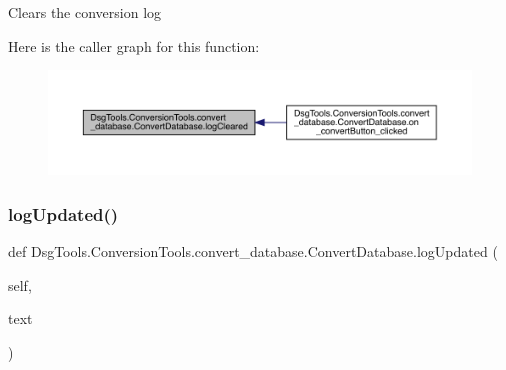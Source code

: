 \begin{DoxyVerb}Clears the conversion log
\end{DoxyVerb}
 Here is the caller graph for this function\+:
\nopagebreak
\begin{figure}[H]
\begin{center}
\leavevmode
\includegraphics[width=350pt]{class_dsg_tools_1_1_conversion_tools_1_1convert__database_1_1_convert_database_a1fdc07691550f2c4fc363b60ab454c0b_icgraph}
\end{center}
\end{figure}
\mbox{\label{class_dsg_tools_1_1_conversion_tools_1_1convert__database_1_1_convert_database_a715b01476121b47d1595f88649eb1428}} 
\subsubsection{\texorpdfstring{log\+Updated()}{logUpdated()}}
{\footnotesize\ttfamily def Dsg\+Tools.\+Conversion\+Tools.\+convert\+\_\+database.\+Convert\+Database.\+log\+Updated (\begin{DoxyParamCaption}\item[{}]{self,  }\item[{}]{text }\end{DoxyParamCaption})}


